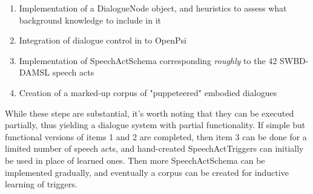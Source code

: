 \documentclass[10pt]{article}
\begin{document}
\begin{enumerate}
\item Implementation of a DialogueNode object, and heuristics to assess what background knowledge to include in it
\item Integration of dialogue control in to OpenPsi
\item Implementation of SpeechActSchema corresponding {\it roughly} to the 42 SWBD-DAMSL speech acts
\item Creation of a marked-up corpus of "puppeteered" embodied dialogues
\end{enumerate}

While these steps are substantial, it's worth noting that they can be executed partially, thus yielding a dialogue system with partial functionality.  If simple but functional versions of items 1 and 2 are completed, then item 3 can be done for a limited number of speech acts, and hand-created SpeechActTriggers can initially be used in place of learned ones.  Then more SpeechActSchema can be implemented gradually, and eventually a corpus can be created for inductive learning of triggers.

%
\end{document}
